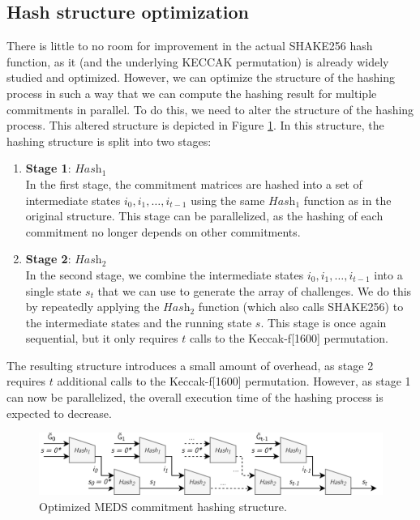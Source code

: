 \documentclass[11pt,a4paper]{report}
\theoremstyle{definition}
\begin{document}
\subsection{Hash structure optimization}
There is little to no room for improvement in the actual SHAKE256 hash function, as it (and the underlying KECCAK permutation) is already widely studied and optimized. However, we can optimize the structure of the hashing process in such a way that we can compute the hashing result for multiple commitments in parallel. To do this, we need to alter the structure of the hashing process. This altered structure is depicted in Figure \ref{fig:hashstructureopt}. In this structure, the hashing structure is split into two stages:
\begin{enumerate}
  \item \textbf{Stage 1}: $\textit{Hash}_1$\\
  In the first stage, the commitment matrices are hashed into a set of intermediate states $i_0, i_1, \ldots, i_{t-1}$ using the same $\textit{Hash}_1$ function as in the original structure. This stage can be parallelized, as the hashing of each commitment no longer depends on other commitments.
  \item \textbf{Stage 2}: $\textit{Hash}_2$\\
  In the second stage, we combine the intermediate states $i_0, i_1, \ldots, i_{t-1}$ into a single state $s_t$ that we can use to generate the array of challenges. We do this by repeatedly applying the $\textit{Hash}_2$ function (which also calls SHAKE256) to the intermediate states and the running state $s$. This stage is once again sequential, but it only requires $t$ calls to the Keccak-f[1600] permutation.
\end{enumerate}
The resulting structure introduces a small amount of overhead, as stage 2 requires $t$ additional calls to the Keccak-f[1600] permutation. However, as stage 1 can now be parallelized, the overall execution time of the hashing process is expected to decrease.

\begin{figure}
  \centering
  \includegraphics[width=\textwidth]{hash/hash_struct_par.png}
  \caption{Optimized MEDS commitment hashing structure.}
  \label{fig:hashstructureopt}
\end{figure}
\end{document}

